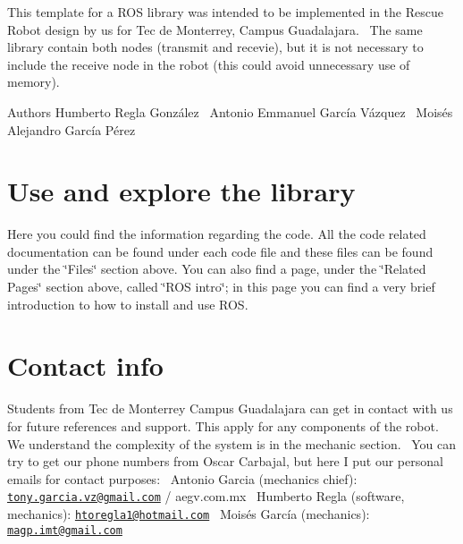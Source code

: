 This template for a R\+OS library was intended to be implemented in the Rescue Robot design by us for Tec de Monterrey, Campus Guadalajara.~\newline
The same library contain both nodes (transmit and recevie), but it is not necessary to include the receive node in the robot (this could avoid unnecessary use of memory).\begin{DoxyAuthor}{Authors}
Humberto Regla González~\newline
Antonio Emmanuel García Vázquez~\newline
Moisés Alejandro García Pérez
\end{DoxyAuthor}
\hypertarget{index_use}{}\section{Use and explore the library}\label{index_use}
Here you could find the information regarding the code. All the code related documentation can be found under each code file and these files can be found under the \char`\"{}\+Files\char`\"{} section above. You can also find a page, under the \char`\"{}\+Related Pages\char`\"{} section above, called \char`\"{}\+R\+O\+S intro\char`\"{}; in this page you can find a very brief introduction to how to install and use R\+OS.\hypertarget{index_contact}{}\section{Contact info}\label{index_contact}
Students from Tec de Monterrey Campus Guadalajara can get in contact with us for future references and support. This apply for any components of the robot.~\newline
We understand the complexity of the system is in the mechanic section.~\newline
You can try to get our phone numbers from Oscar Carbajal, but here I put our personal emails for contact purposes\+:~\newline
Antonio Garcia (mechanics chief)\+: \href{mailto:tony.garcia.vz@gmail.com}{\tt tony.\+garcia.\+vz@gmail.\+com} / aegv.\+com.\+mx~\newline
Humberto Regla (software, mechanics)\+: \href{mailto:htoregla1@hotmail.com}{\tt htoregla1@hotmail.\+com}~\newline
Moisés García (mechanics)\+: \href{mailto:magp.imt@gmail.com}{\tt magp.\+imt@gmail.\+com} 